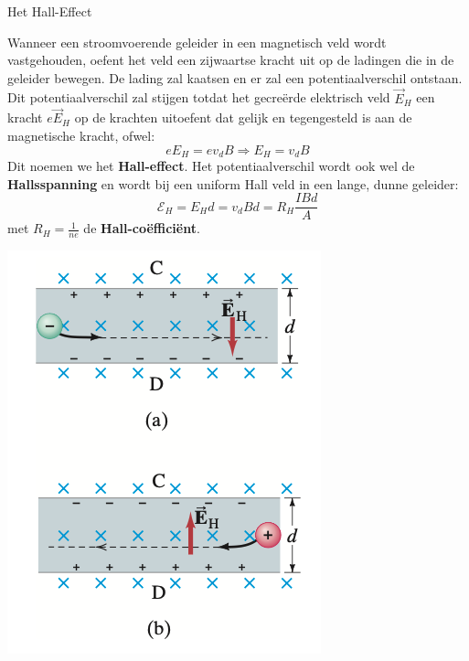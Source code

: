 \newpage

\begin{theo}{Het Hall-Effect}
    \begin{minipage}{0.78\textwidth}
        Wanneer een stroomvoerende geleider in een magnetisch veld wordt vastgehouden,
        oefent het veld een zijwaartse kracht uit op de ladingen die in de geleider bewegen.
        De lading zal kaatsen en er zal een potentiaalverschil ontstaan. Dit potentiaalverschil zal
        stijgen totdat het gecreërde elektrisch veld $\Vec{E}_H$ een kracht $e\Vec{E}_H$
        op de krachten uitoefent dat gelijk en tegengesteld is aan de magnetische kracht, ofwel:
        \begin{equation*}
            eE_H = ev_{d}B \Rightarrow E_H = v_{d}B
        \end{equation*}
        Dit noemen we het \textbf{Hall-effect}. Het potentiaalverschil wordt ook wel de \textbf{Hallsspanning}
        en wordt bij een uniform Hall veld in een lange, dunne geleider:
        \begin{equation*}
            \mathcal{E}_H = E_{H}d = v_{d}Bd = R_H\dfrac{IBd}{A}
        \end{equation*}
        met $R_H = \tfrac{1}{ne}$ de \textbf{Hall-coëfficiënt}.
    \end{minipage}
    \begin{minipage}{.18\textwidth}
        \includegraphics[scale = 0.3]{Images/Magnetisme/HallEffect}
    \end{minipage}
    \vspace{0.2cm}

\end{theo}

